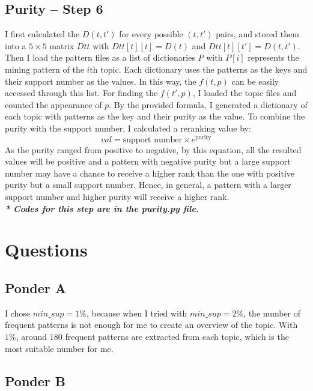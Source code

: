 \documentclass[11pt]{article}
\begin{document}
\subsection{Purity -- Step 6}
I first calculated the $D(t,t')$ for every possible $(t,t')$ pairs, and stored them into a $5\times5$ matrix $Dtt$ with $Dtt[t][t] = D(t)$ and $Dtt[t][t'] = D(t,t')$. Then I load the pattern files as a list of dictionaries $P$ with $P[i]$ represents the mining pattern of the $i$th topic. Each dictionary uses the patterns as the keys and their support number as the values. In this way, the $f(t,p)$ can be easily accessed through this list. For finding the $f(t',p)$, I loaded the topic files and counted the appearance of $p$. By the provided formula, I generated a dictionary of each topic with patterns as the key and their purity as the value. To combine the purity with the support number, I calculated a reranking value by:
\begin{equation*}
val = \text{support number} \times  e ^{ \text{purity}}
\end{equation*}
As the purity ranged from positive to negative, by this equation, all the resulted values will be positive and a pattern with negative purity but a large support number may have a chance to receive a higher rank than the one with positive purity but a small support number. Hence, in general, a pattern with a larger support number and higher purity will receive a higher rank.\\
\textit{\textbf{* Codes for this step are in the purity.py file.}}

\section{Questions}

\subsection{Ponder A}

I chose $min\_sup = 1\%$, because when I tried with $min\_sup = 2\%$, the number of frequent patterns is not enough for me to create an overview of the topic. With $1\%$, around 180 frequent patterns are extracted from each topic, which is the most suitable number for me.


\subsection{Ponder B}
\end{document}
